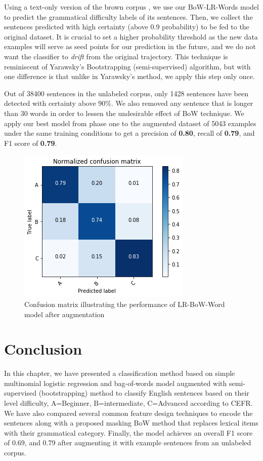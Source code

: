 Using a text-only version of the brown corpus \citep{citeulike: 13797746}, we use our BoW-LR-Words model to predict the grammatical difficulty labels of its sentences. Then, we collect the sentences predicted with high certainty (above 0.9 probability) to be fed to the original dataset. It is crucial to set a higher probability threshold as the new data examples will serve as seed points for our prediction in the future, and we do not want the classifier to \textit{drift} from the original trajectory. This technique is reminiscent of Yarawsky's Bootstrapping \citep{yarowsky_unsupervised_1995}(semi-supervised) algorithm, but with one difference is that unlike in Yarawsky's method, we apply this step only once. 

Out of 38400 sentences in the unlabeled corpus, only 1428 sentences have been detected with certainty above 90\%. We also removed any sentence that is longer than 30 words in order to lessen the undesirable effect of BoW technique. We apply our best model from phase one to the augmented dataset of 5043 examples under the same training conditions to get a precision of \textbf{0.80}, recall of \textbf{0.79}, and F1 score of \textbf{0.79}. 

\begin{figure}[t]
    \centering
    \includegraphics[width=.75\linewidth]{../Figures/conf_matrix_iter2.png} 
    \caption{Confusion matrix illustrating the performance of LR-BoW-Word model after augmentation}
    \label{fig:cmdstudy}
\end{figure}

\section {Conclusion}
\label{sec:conclusion}
In this chapter, we have presented a classification method based on simple multinomial logistic regression and bag-of-words model augmented with semi-supervised (bootstrapping) method to classify English sentences based on their level difficulty, A=Beginner, B=intermediate, C=Advanced according to CEFR. We have also compared several common feature design techniques to encode the sentences along with a proposed masking BoW method that replaces lexical items with their grammatical category. Finally, the model achieves an overall F1 score of 0.69, and 0.79 after augmenting it with example sentences from an unlabeled corpus.
